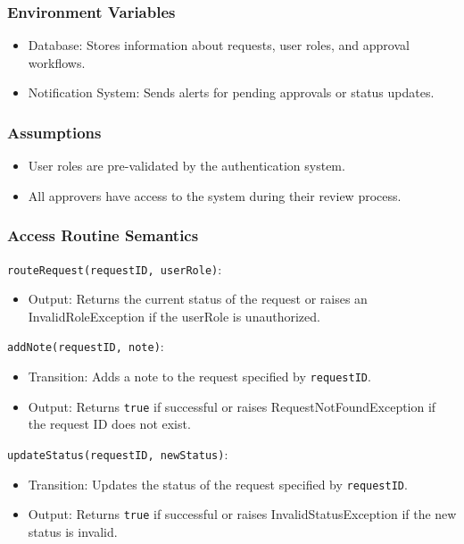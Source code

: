 \documentclass[12pt, titlepage]{article}
\begin{document}
\subsubsection{Environment Variables}
\begin{itemize}
    \item Database: Stores information about requests, user roles, and approval workflows.
    \item Notification System: Sends alerts for pending approvals or status updates.
\end{itemize}

\subsubsection{Assumptions}
\begin{itemize}
    \item User roles are pre-validated by the authentication system.
    \item All approvers have access to the system during their review process.
\end{itemize}

\subsubsection{Access Routine Semantics}
\noindent \texttt{routeRequest(requestID, userRole)}:
\begin{itemize}
    \item Output: Returns the current status of the request or raises an InvalidRoleException if the userRole is unauthorized.
\end{itemize}

\noindent \texttt{addNote(requestID, note)}:
\begin{itemize}
    \item Transition: Adds a note to the request specified by \texttt{requestID}.
    \item Output: Returns \texttt{true} if successful or raises RequestNotFoundException if the request ID does not exist.
\end{itemize}

\noindent \texttt{updateStatus(requestID, newStatus)}:
\begin{itemize}
    \item Transition: Updates the status of the request specified by \texttt{requestID}.
    \item Output: Returns \texttt{true} if successful or raises InvalidStatusException if the new status is invalid.
\end{itemize}
\end{document}

